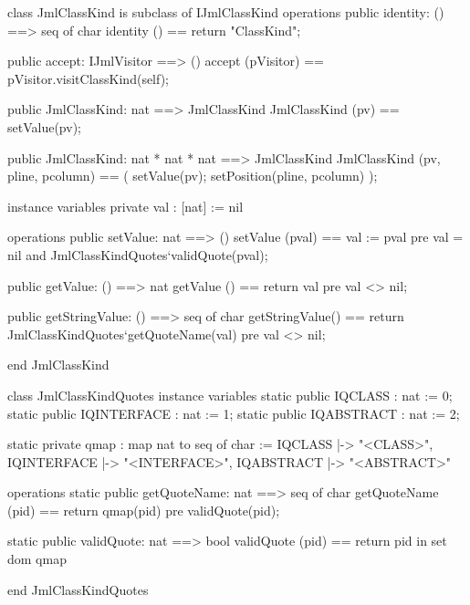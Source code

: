 \begin{vdm_al}
class JmlClassKind is subclass of IJmlClassKind
operations
  public identity: () ==> seq of char
  identity () == return "ClassKind";

  public accept: IJmlVisitor ==> ()
  accept (pVisitor) == pVisitor.visitClassKind(self);

  public JmlClassKind: nat ==> JmlClassKind
  JmlClassKind (pv) == setValue(pv);

  public JmlClassKind: nat * nat * nat ==> JmlClassKind
  JmlClassKind (pv, pline, pcolumn) == ( setValue(pv); setPosition(pline, pcolumn) );

instance variables
  private val : [nat] := nil

operations
  public setValue: nat ==> ()
  setValue (pval) == val := pval
    pre val = nil and JmlClassKindQuotes`validQuote(pval);

  public getValue: () ==> nat
  getValue () == return val
    pre val <> nil;

  public getStringValue: () ==> seq of char
  getStringValue() == return JmlClassKindQuotes`getQuoteName(val)
    pre val <> nil;

end JmlClassKind
\end{vdm_al}
\begin{vdm_al}
class JmlClassKindQuotes
instance variables
  static public IQCLASS : nat := 0;
  static public IQINTERFACE : nat := 1;
  static public IQABSTRACT : nat := 2;

  static private qmap : map nat to seq of char :=
    { IQCLASS |-> "<CLASS>",
      IQINTERFACE |-> "<INTERFACE>",
      IQABSTRACT |-> "<ABSTRACT>" }

operations
  static public getQuoteName: nat ==> seq of char
  getQuoteName (pid) ==
    return qmap(pid)
    pre validQuote(pid);

  static public validQuote: nat ==> bool
  validQuote (pid) == return pid in set dom qmap

end JmlClassKindQuotes
\end{vdm_al}
